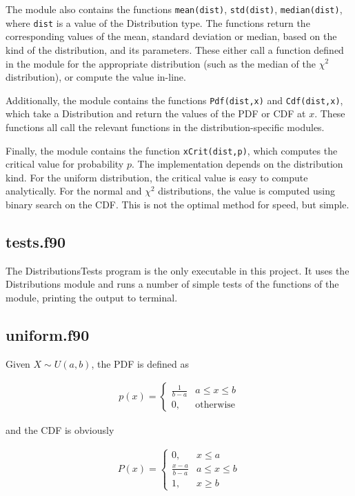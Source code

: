 \documentclass[a4paper]{article}
\begin{document}
The module also contains the functions \verb+mean(dist)+, \verb+std(dist)+, \verb+median(dist)+, where \verb+dist+ is a value of the Distribution type. The functions return the corresponding values of the mean, standard deviation or median, based on the kind of the distribution, and its parameters. These either call a function defined in the module for the appropriate distribution (such as the median of the $\chi^2$ distribution), or compute the value in-line.

Additionally, the module contains the functions \verb+Pdf(dist,x)+ and \verb+Cdf(dist,x)+, which take a Distribution and return the values of the PDF or CDF at $x$. These functions all call the relevant functions in the distribution-specific modules.

Finally, the module contains the function \verb+xCrit(dist,p)+, which computes the critical value for probability $p$. The implementation depends on the distribution kind. For the uniform distribution, the critical value is easy to compute analytically. For the normal and $\chi^2$ distributions, the value is computed using binary search on the CDF. This is not the optimal method for speed, but simple.

\subsection{tests.f90}

The DistributionsTests program is the only executable in this project. It uses the Distributions module and runs a number of simple tests of the functions of the module, printing the output to terminal.

\subsection{uniform.f90}

Given $X \sim U(a,b)$, the PDF is defined as

\begin{align}
    p(x) = \left\{ \begin{array}{ll}
        \frac{1}{b-a} & a \le x \le b \\
        0, & \text{otherwise}
    \end{array} \right.
\end{align}

and the CDF is obviously

\begin{align}
    P(x) = \left\{ \begin{array}{ll}
        0, & x \le a \\
        \frac{x-a}{b-a} & a \le x \le b \\
        1, & x \ge b
    \end{array} \right.
\end{align}
\end{document}
